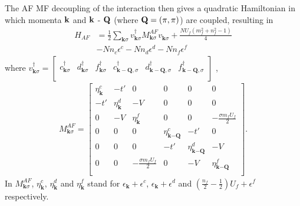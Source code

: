 \documentclass[pra,letterpaper,10pt,twocolumn]{revtex4}
\begin{document}
The AF MF decoupling of the interaction then gives a quadratic
Hamiltonian in which momenta ${\bf k}$ and ${\bf k}$ - ${\bf Q}$ (where
${\bf Q}=(\pi,\pi)$) are coupled, resulting in
\begin{align}
  H_{AF}&=\frac{1}{2}\sum_{\textbf{k}\sigma}v^{\dagger}_{\textbf{k}\sigma}
  M^{AF}_{\textbf{k}\sigma}
  v^{\phantom{\dagger}}_{\textbf{k}\sigma}+\frac{NU_f(m^2_f + n^2_f - 1)}{4}  \nonumber\\
  &-N n_c \epsilon^c - N n_d \epsilon^d - N n_f \epsilon^f
\label{eq:MFT_H_AFM}
\end{align}
where $v^{\dagger}_{\textbf{k}\sigma}=\left[ {\begin{array}{cccccc}
   c^{\dagger}_{\textbf{k}\sigma} & d^{\dagger}_{\textbf{k}\sigma} & f^{\dagger}_{\textbf{k}\sigma} &
   c^{\dagger}_{\textbf{k}-\textbf{Q},\sigma} & d^{\dagger}_{\textbf{k}-\textbf{Q},\sigma} & f^{\dagger}_{\textbf{k}-\textbf{Q},\sigma} \\
  \end{array} } \right]$
, 
\begin{align}
  M^{AF}_{\textbf{k}\sigma}=\left[ {\begin{array}{cccccc}
   \eta^c_{\textbf{k}} & -t' & 0 & 0 & 0 & 0\\
   -t' & \eta^d_{\textbf{k}} & -V  & 0 & 0 & 0\\
   0 & -V & \eta^f_{\textbf{k}}  & 0 & 0 & -\frac{\sigma m_f U_f}{2} \\
   0 & 0 & 0 & \eta^c_{\textbf{k}-\textbf{Q}} & -t' & 0\\
   0 & 0 & 0 & -t' & \eta^d_{\textbf{k}-\textbf{Q}} & -V \\
   0 & 0 & -\frac{\sigma m_fU_f}{2} & 0 & -V & \eta^f_{\textbf{k}-\textbf{Q}} \\
  \end{array} } \right] .
\nonumber
\end{align}
In $M^{AF}_{\textbf{k}\sigma}$, $\eta^c_{\textbf{k}}$,
$\eta^d_{\textbf{k}}$ and $\eta^f_{\textbf{k}}$ stand for
$\epsilon_{\textbf{k}}+\epsilon^c$, $\epsilon_{\textbf{k}}+\epsilon^d$
and $(\frac{n_f}{2}-\frac{1}{2})U_f+\epsilon^f$ respectively.
\end{document}
